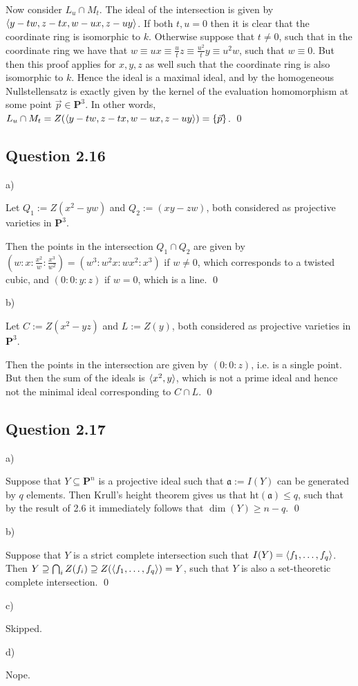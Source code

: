 \documentclass{article}
\begin{document}
Now consider $L_u \cap M_t$. The ideal of the intersection is given by $\langle y-tw, z-tx,w-ux, z-uy\rangle$. If both $t,u=0$ then it is clear that the coordinate ring is isomorphic to $k$. Otherwise suppose that $t \neq 0$, such that in the coordinate ring we have that $w \equiv ux \equiv \frac{u}{t}z \equiv \frac{u^2}{t}y \equiv u^2 w$, such that $w \equiv 0$. But then this proof applies for $x,y,z$ as well such that the coordinate ring is also isomorphic to $k$. Hence the ideal is a maximal ideal, and by the homogeneous Nullstellensatz is exactly given by the kernel of the evaluation homomorphism at some point $\vec p \in \mathbf{P}^3$. In other words, $L_u \cap M_t = Z(\langle y-tw, z-tx,w-ux, z-uy\rangle) = \{\vec p\}$. \qed
\lspace

\subsection*{Question 2.16}

\noindent a)

Let $Q_1 := Z(x^2-yw)$ and $Q_2 := (xy-zw)$, both considered as projective varieties in $\mathbf{P}^3$.

Then the points in the intersection $Q_1 \cap Q_2$ are given by $(w:x:\frac{x^2}{w}:\frac{x^3}{w^2}) = (w^3:w^2x:wx^2:x^3)$ if $w \neq 0$, which corresponds to a twisted cubic, and $(0:0:y:z)$ if $w=0$, which is a line. \qed

\noindent b)

Let $C := Z(x^2-yz)$ and $L:=Z(y)$, both considered as projective varieties in $\mathbf{P}^3$.

Then the points in the intersection are given by $(0:0:z)$, i.e. is a single point. But then the sum of the ideals is $\langle x^2,y\rangle$, which is not a prime ideal and hence not the minimal ideal corresponding to $C \cap L$. \qed
\lspace

\subsection*{Question 2.17}

\noindent a)

Suppose that $Y \subseteq \mathbf{P}^n$ is a projective ideal such that $\mathfrak a:= I(Y)$ can be generated by $q$ elements. Then Krull's height theorem gives us that $\text{ht}(\mathfrak a) \leq q$, such that by the result of 2.6 it immediately follows that $\dim(Y) \geq n-q$. \qed

\noindent b)

Suppose that $Y$ is a strict complete intersection such that $I(Y) = \langle f_1,\dots,f_q\rangle$. Then $Y \supseteq \bigcap_i Z(f_i) \supseteq Z(\langle f_1,\dots,f_q\rangle) = Y$, such that $Y$ is also a set-theoretic complete intersection. \qed

\noindent c)

Skipped.

\noindent d)

Nope.
\end{document}

